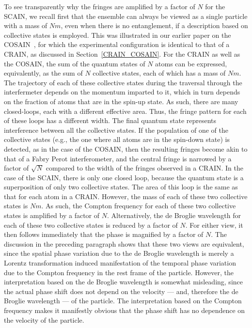 \documentclass[aps,pra,letterpaper,superscriptaddress,showpacs,amsmath,floats,twocolumn]{revtex4-1}
\begin{document}
To see transparently why the fringes are amplified by a factor of $N$ for the SCAIN, we recall first that the ensemble can always be viewed as a single particle with a mass of $Nm$, even when there is no entanglement, if a description based on collective states is employed. This was illustrated in our earlier paper on the COSAIN~\cite{COSAIN}, for which the experimental configuration is identical to that of a CRAIN, as discussed in Section~\ref{CRAIN_COSAIN}. For the CRAIN as well as the COSAIN, the sum of the quantum states of $N$ atoms can be expressed, equivalently, as the sum of $N$ collective states, each of which has a mass of $Nm$. The trajectory of each of these collective states during the traversal through the interfermeter depends on the momentum imparted to it, which in turn depends on the fraction of atoms that are in the spin-up state. As such, there are many closed-loops, each with a different effective area. Thus, the fringe pattern for each of these loops has a different width. The final quantum state represents interference between all the collective states. If the population of one of the collective states (e.g., the one where all atoms are in the spin-down state) is detected, as in the case of the COSAIN, then the resulting fringes become akin to that of a Fabry Perot interferometer, and the central fringe is narrowed by a factor of $\sqrt{N}$ compared to the width of the fringes observed in a CRAIN. In the case of the SCAIN, there is only one closed loop, because the quantum state is a superposition of only two collective states. The area of this loop is the same as that for each atom in a CRAIN. However, the mass of each of these two collective states is $Nm$. As such, the Compton frequency for each of these two collective states is amplified by a factor of $N$. Alternatively, the de Broglie wavelength for each of these two collective states is reduced by a factor of $N$.  For either view, it then follows immediately that the phase is magnified by a factor of $N$. The discussion in the preceding paragraph shows that these two views are equivalent, since the spatial phase variation due to the de Broglie wavelength is merely a Lorentz transformation induced manifestation of the temporal phase variation due to the Compton frequency in the rest frame of the particle. However, the interpretation based on the de Broglie wavelength is somewhat misleading, since the actual phase shift does not depend on the velocity --- and, therefore the de Broglie wavelength --- of the particle. The interpretation based on the Compton frequency makes it manifestly obvious that the phase shift has no dependence on the velocity of the particle. 
\end{document}
